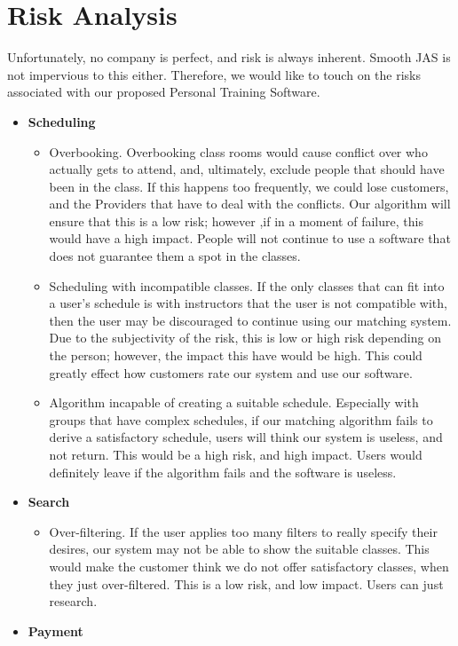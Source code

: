 \documentclass[12pt]{article}
\begin{document}
\section{Risk Analysis}
Unfortunately, no company is perfect, and risk is always inherent. Smooth JAS is not impervious to this either. Therefore, we would like to touch on the risks associated with our proposed Personal Training Software.
\begin{itemize}
\item \textbf{Scheduling}
\begin{itemize}
\item Overbooking. Overbooking class rooms would cause conflict over who actually gets to attend, and, ultimately, exclude people that should have been in the class. If this happens too frequently, we could lose customers, and the Providers that have to deal with the conflicts. Our algorithm will ensure that this is a low risk; however ,if in a moment of failure, this would have a high impact. People will not continue to use a software that does not guarantee them a spot in the classes.
\item Scheduling with incompatible classes. If the only classes that can fit into a user's schedule is with instructors that the user is not compatible with, then the user may be discouraged to continue using our matching system. Due to the subjectivity of the risk, this is low or high risk depending on the person; however, the impact this have would be high. This could greatly effect how customers rate our system and use our software.
\item Algorithm incapable of creating a suitable schedule. Especially with groups that have complex schedules, if our matching algorithm fails to derive a satisfactory schedule, users will think our system is useless, and not return. This would be a high risk, and high impact. Users would definitely leave if the algorithm fails and the software is useless. 
\end{itemize}
\item \textbf{Search}
\begin{itemize}
\item Over-filtering. If the user applies too many filters to really specify their desires, our system may not be able to show the suitable classes. This would make the customer think we do not offer satisfactory classes, when they just over-filtered. This is a low risk, and low impact. Users can just research.
\end{itemize}
\item \textbf{Payment}

\end{itemize}
\end{document}
